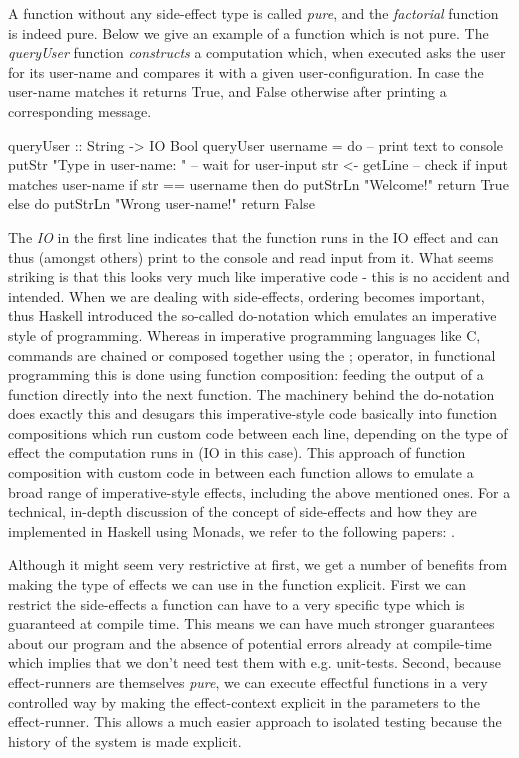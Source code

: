 A function without any side-effect type is called \textit{pure}, and the \textit{factorial} function is indeed pure. Below we give an example of a function which is not pure. The \textit{queryUser} function \textit{constructs} a computation which, when executed asks the user for its user-name and compares it with a given user-configuration. In case the user-name matches it returns True, and False otherwise after printing a corresponding message. 

\begin{HaskellCode}
queryUser :: String -> IO Bool
queryUser username = do
  -- print text to console
  putStr "Type in user-name: "
  -- wait for user-input
  str <- getLine
  -- check if input matches user-name
  if str == username
    then do
      putStrLn "Welcome!"			
      return True
    else do
      putStrLn "Wrong user-name!"
      return False
\end{HaskellCode}

The \textit{IO} in the first line indicates that the function runs in the IO effect and can thus (amongst others) print to the console and read input from it. What seems striking is that this looks very much like imperative code - this is no accident and intended. When we are dealing with side-effects, ordering becomes important, thus Haskell introduced the so-called do-notation which emulates an imperative style of programming. Whereas in imperative programming languages like C, commands are chained or composed together using the ; operator, in functional programming this is done using function composition: feeding the output of a function directly into the next function. The machinery behind the do-notation does exactly this and desugars this imperative-style code basically into function compositions which run custom code between each line, depending on the type of effect the computation runs in (IO in this case). This approach of function composition with custom code in between each function allows to emulate a broad range of imperative-style effects, including the above mentioned ones. For a technical, in-depth discussion of the concept of side-effects and how they are implemented in Haskell using Monads, we refer to the following papers: \cite{moggi_computational_1989,wadler_essence_1992,wadler_monads_1995,wadler_how_1997,jones_tackling_2002}.

Although it might seem very restrictive at first, we get a number of benefits from making the type of effects we can use in the function explicit. First we can restrict the side-effects a function can have to a very specific type which is guaranteed at compile time. This means we can have much stronger guarantees about our program and the absence of potential errors already at compile-time which implies that we don't need test them with e.g. unit-tests. Second, because effect-runners are themselves \textit{pure}, we can execute effectful functions in a very controlled way by making the effect-context explicit in the parameters to the effect-runner. This allows a much easier approach to isolated testing because the history of the system is made explicit.

